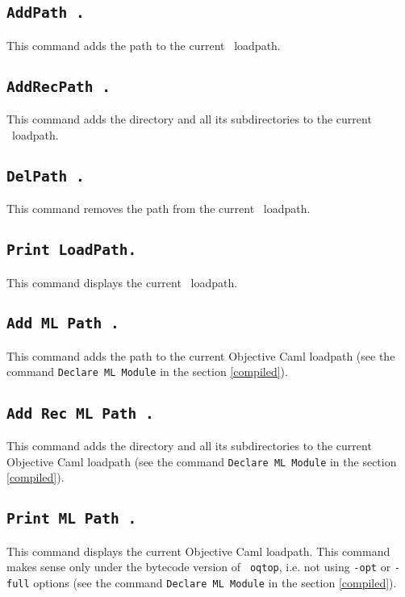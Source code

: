 \subsection{\tt AddPath {\str}.}
This command adds the path {\str} to the current \Coq\ loadpath.

\subsection{\tt AddRecPath {\str}.}
This command adds the directory {\str} and all its subdirectories 
to the current \Coq\ loadpath.

\subsection{\tt DelPath {\str}.}
This command removes the path {\str} from the current \Coq\ loadpath.

\subsection{\tt Print LoadPath.}
This command displays the current \Coq\ loadpath.

\subsection{\tt Add ML Path {\str}.}
This command adds the path {\str} to the current Objective Caml loadpath (see
the command {\tt Declare ML Module} in the section \ref{compiled}).

\subsection{\tt Add Rec ML Path {\str}.}
This command adds the directory {\str} and all its subdirectories 
to the current Objective Caml loadpath (see
the command {\tt Declare ML Module} in the section \ref{compiled}).

\subsection{\tt Print ML Path {\str}.}
This command displays the current Objective Caml loadpath.
This command makes sense only under the bytecode version of {\tt
oqtop}, i.e. not using {\tt -opt} or {\tt -full} options (see the
command {\tt Declare ML Module} in the section
\ref{compiled}).

